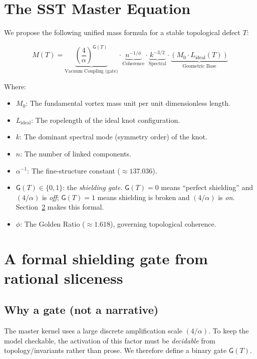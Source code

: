\documentclass[11pt, a4paper]{article}
\begin{document}
\section{The SST Master Equation}
We propose the following unified mass formula for a stable topological defect $T$:

\begin{equation}
    M(T) =
    \underbrace{\left( \frac{4}{\alpha} \right)^{\mathsf{G}(T)}}_{\text{Vacuum Coupling (gate)}}
    \cdot \underbrace{n^{-1/\phi}}_{\text{Coherence}}
    \cdot \underbrace{k^{-3/2}}_{\text{Spectral}}
    \cdot \underbrace{\left( M_0 \cdot L_{\text{ideal}}(T) \right)}_{\text{Geometric Base}}
\end{equation}

Where:
\begin{itemize}
    \item $M_0$: The fundamental vortex mass unit per unit dimensionless length.
    \item $L_{\text{ideal}}$: The ropelength of the ideal knot configuration.
    \item $k$: The dominant spectral mode (symmetry order) of the knot.
    \item $n$: The number of linked components.
    \item $\alpha^{-1}$: The fine-structure constant ($\approx 137.036$).
    \item $\mathsf{G}(T)\in\{0,1\}$: the \emph{shielding gate}.  \(\mathsf{G}(T)=0\) means ``perfect shielding'' and \((4/\alpha)\) is \emph{off};
    \(\mathsf{G}(T)=1\) means shielding is broken and \((4/\alpha)\) is \emph{on}.  Section~\ref{sec:gate} makes this formal.
    \item $\phi$: The Golden Ratio ($\approx 1.618$), governing topological coherence.
\end{itemize}

\section{A formal shielding gate from rational sliceness}\label{sec:gate}
\subsection{Why a gate (not a narrative)}
The master kernel uses a large discrete amplification scale \((4/\alpha)\).  To keep the model checkable, the activation of this factor must be
\emph{decidable} from topology/invariants rather than prose.  We therefore define a binary gate \(\mathsf{G}(T)\).
\end{document}
